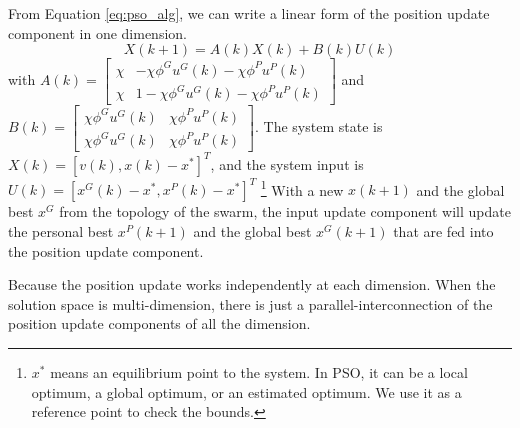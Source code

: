 From Equation \eqref{eq:pso_alg}, we can write a linear form of the position update component in one dimension.
\begin{equation}
\label{eq:pso_up_linalg_simp}
X(k+1) = A(k) X(k) + B(k) U(k)
\end{equation}
with
$ A(k) = \begin{bmatrix}
\chi & - \chi \phi^{G} u^{G}(k) - \chi \phi^{P} u^{P}(k)
\\ 
\chi & 1 - \chi \phi^{G} u^{G}(k) - \chi \phi^{P} u^{P}(k)
\end{bmatrix} $
and
$ B(k) = \begin{bmatrix}
\chi \phi^{G} u^{G}(k) & \chi \phi^{P} u^{P}(k)
\\ 
\chi \phi^{G} u^{G}(k) & \chi \phi^{P} u^{P}(k)
\end{bmatrix} $.
The system state is $ X(k) = [ v(k), x(k) - x^{*} ]^{T} $, and the system input is $ U(k) = [ x^{G}(k) - x^{*} , x^{P}(k) - x^{*} ]^{T} $
\footnote{$ x^{*} $ means an equilibrium point to the system.
In PSO, it can be a local optimum, a global optimum, or an estimated optimum.
We use it as a reference point to check the bounds.}
With a new $ x(k+1) $ and the global best $ x^{G} $ from the topology of the swarm, the input update component will update the personal best $ x^{P}(k+1) $ and the global best $ x^{G}(k+1) $ that are fed into the position update component.

Because the position update works independently at each dimension.
When the solution space is multi-dimension, there is just a parallel-interconnection of the position update components of all the dimension.
